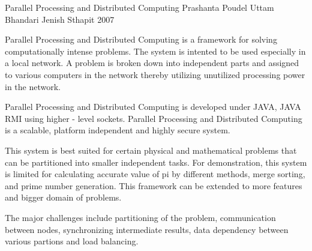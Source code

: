  \begin{conf-abstract}[]
{Parallel Processing and Distributed Computing }
{
           Prashanta Poudel
           Uttam Bhandari
           Jenish Sthapit
}
{ 2007 }

Parallel Processing and Distributed Computing is a framework for solving computationally intense problems. The system is intented to be used especially in a local network. A problem is broken down into independent parts and assigned to various computers in the network thereby utilizing unutilized processing power in the network.

Parallel Processing and Distributed Computing is developed under JAVA, JAVA RMI using higher - level sockets. Parallel Processing and Distributed Computing is a scalable, platform independent and highly secure system.

This system is best suited for certain physical and mathematical problems that can be partitioned into smaller independent tasks. For demonstration, this system is limited for calculating accurate value of pi by different  methods, merge sorting, and prime number generation. This framework can be extended to more features and bigger domain of problems.

The major challenges include partitioning of the problem, communication between nodes, synchronizing intermediate results, data dependency between various partions and load balancing.
  \end{conf-abstract}